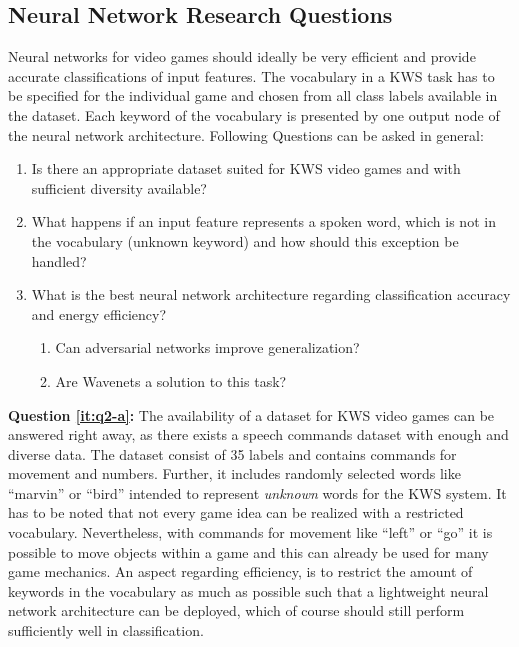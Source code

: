 \subsection{Neural Network Research Questions}\label{sec:intro_rq_nn}
Neural networks for video games should ideally be very efficient and provide accurate classifications of input features.
The vocabulary in a KWS task has to be specified for the individual game and chosen from all class labels available in the dataset.
Each keyword of the vocabulary is presented by one output node of the neural network architecture.
Following Questions can be asked in general:
\begin{enumerate}[label={Q.2.\alph*)}, leftmargin=1.75cm]
  \item Is there an appropriate dataset suited for KWS video games and with sufficient diversity available?\label{it:q2-a}
  \item What happens if an input feature represents a spoken word, which is not in the vocabulary (unknown keyword) and how should this exception be handled?\label{it:q2-b}
  \item What is the best neural network architecture regarding classification accuracy and energy efficiency?\label{it:q2-c}
  \begin{enumerate}[label=(\roman*)]
    \item Can adversarial networks improve generalization?
    \item Are Wavenets a solution to this task?
  \end{enumerate}
\end{enumerate}
\noindent
\textbf{Question \ref{it:q2-a}:} 
The availability of a dataset for KWS video games can be answered right away, as there exists a speech commands dataset \cite{Warden2018} with enough and diverse data.
The dataset consist of 35 labels and contains commands for movement and numbers.
Further, it includes randomly selected words like \enquote{marvin} or \enquote{bird} intended to represent \emph{unknown} words for the KWS system.
It has to be noted that not every game idea can be realized with a restricted vocabulary.
Nevertheless, with commands for movement like \enquote{left} or \enquote{go} it is possible to move objects within a game and this can already be used for many game mechanics.
An aspect regarding efficiency, is to restrict the amount of keywords in the vocabulary as much as possible such that a lightweight neural network architecture can be deployed, which of course should still perform sufficiently well in classification.

